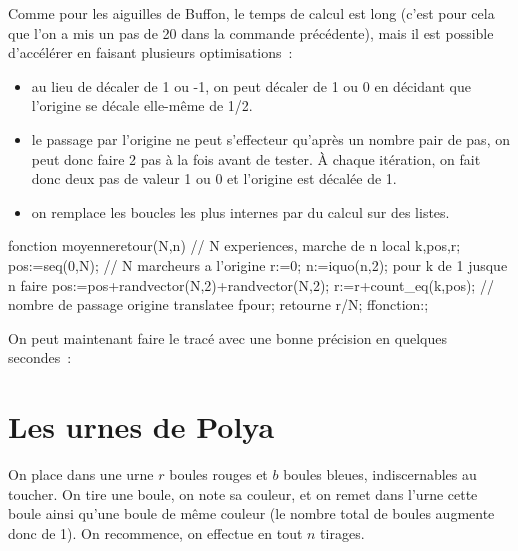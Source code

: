 \documentclass[12pt,a4paper]{book}
\begin{document}
\begin{giacjshere}
Comme pour les aiguilles de Buffon, le temps de calcul est long (c'est
pour cela que l'on a mis un pas de 20 dans la commande pr\'ec\'edente),
mais il est possible d'acc\'el\'erer en faisant plusieurs optimisations~:
\begin{itemize}
\item au lieu de d\'ecaler de 1 ou -1, on peut d\'ecaler de 1 ou 0
en d\'ecidant que l'origine se d\'ecale elle-m\^eme de 1/2.
\item le passage par l'origine ne peut s'effecteur qu'apr\`es un nombre
pair de pas, on peut donc faire 2 pas \`a la fois avant
de tester. \`A chaque it\'eration, on fait 
donc deux pas de valeur 1 ou 0 et l'origine
est d\'ecal\'ee de 1.
\item on remplace les boucles les plus internes
par du calcul sur des listes.
\end{itemize}
\begin{giaconload}
fonction moyenneretour(N,n) // N experiences, marche de n
  local k,pos,r;
  pos:=seq(0,N); // N marcheurs a l'origine
  r:=0;
  n:=iquo(n,2);
  pour k de 1 jusque n faire
    pos:=pos+randvector(N,2)+randvector(N,2); 
    r:=r+count_eq(k,pos); // nombre de passage origine translatee
  fpour;
  retourne r/N;
ffonction:;
\end{giaconload}
On peut maintenant faire le trac\'e avec une bonne pr\'ecision en
quelques secondes~:\\

\section{Les urnes de Polya}
On place dans une urne $r$ boules rouges et $b$ boules bleues, indiscernables
au toucher.
On tire une boule, on note sa couleur, et on remet dans l'urne cette boule 
ainsi qu'une boule de m\^eme couleur (le nombre total de boules
augmente donc de 1). On recommence, on effectue en tout $n$ tirages.


\end{giacjshere}
\end{document}
